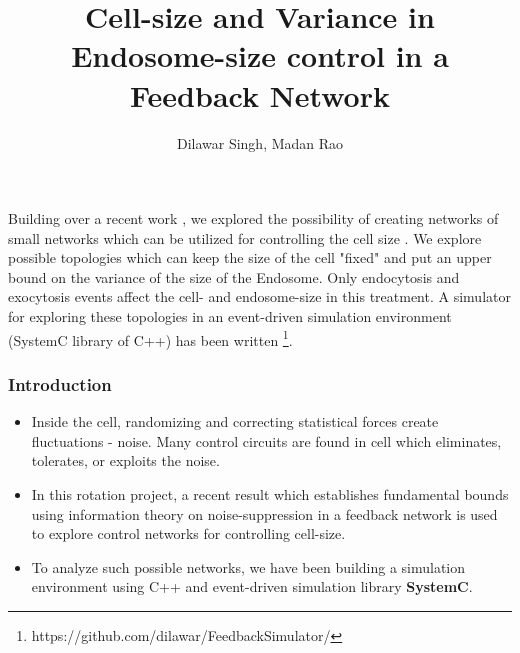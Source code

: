 \documentclass{beamer}
\title {Cell-size and Variance in Endosome-size control in a Feedback Network }
\author{Dilawar Singh, Madan Rao}
\date{}
\begin{document}
\begin{frame}
    \maketitle

    \small
    Building over a recent work \cite{paulsson}, we explored the possibility of
    creating networks of small networks which can be utilized for controlling
    the cell size . We explore possible topologies which can keep the size of
    the cell "fixed" and put an upper bound on the variance of the size of the
    Endosome. Only endocytosis and exocytosis events affect the cell- and
    endosome-size in this treatment.  A simulator for exploring these topologies
    in an event-driven simulation environment (SystemC library of C++) has been
    written \footnote{https://github.com/dilawar/FeedbackSimulator/}.

\end{frame}

\begin{frame}
    \frametitle{Introduction}

    \begin{itemize} 

        \item Inside the cell, randomizing and correcting statistical forces
            create fluctuations - noise. Many control circuits are found in cell
            which eliminates, tolerates, or exploits the noise.  

        \item In this rotation project, a recent result \cite{paulsson} which
            establishes fundamental bounds using information theory on
            noise-suppression in a feedback network is used to explore control
            networks for controlling cell-size.

        \item To analyze such possible networks, we have been building a
            simulation environment using C++ and event-driven simulation library
            \textbf{SystemC}.

    \end{itemize}

    
\end{frame}
\end{document}
